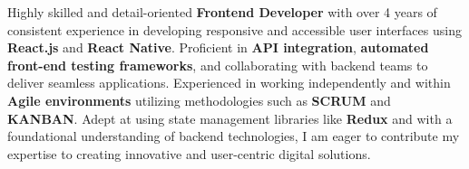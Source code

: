 
Highly skilled and detail-oriented \textbf{Frontend Developer} with over 4 years of consistent experience in developing responsive and accessible user interfaces using \textbf{React.js} and \textbf{React Native}. Proficient in \textbf{API integration}, \textbf{automated front-end testing frameworks}, and collaborating with backend teams to deliver seamless applications. Experienced in working independently and within \textbf{Agile environments} utilizing methodologies such as \textbf{SCRUM} and \textbf{KANBAN}. Adept at using state management libraries like \textbf{Redux} and with a foundational understanding of backend technologies, I am eager to contribute my expertise to creating innovative and user-centric digital solutions.
